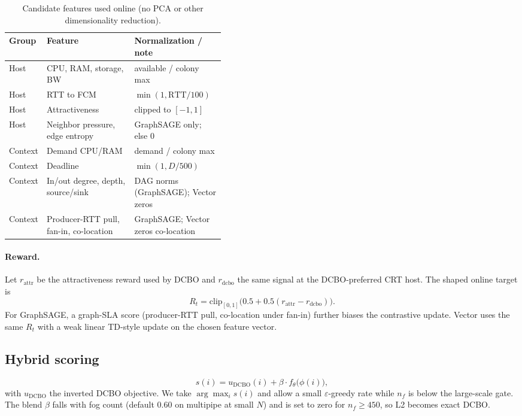 \documentclass[11pt,a4paper]{article}
\begin{document}
\begin{table}[htbp]
\centering
\caption{Candidate features used online (no PCA or other dimensionality reduction).}
\label{tab:features}
\small
\begin{tabular}{@{}llp{0.42\linewidth}@{}}
\toprule
Group & Feature & Normalization / note \\
\midrule
Host & CPU, RAM, storage, BW & available / colony max \\
Host & RTT to FCM & $\min(1,\mathrm{RTT}/100)$ \\
Host & Attractiveness & clipped to $[-1,1]$ \\
Host & Neighbor pressure, edge entropy & GraphSAGE only; else $0$ \\
Context & Demand CPU/RAM & demand / colony max \\
Context & Deadline & $\min(1,D/500)$ \\
Context & In/out degree, depth, source/sink & DAG norms (GraphSAGE); Vector zeros \\
Context & Producer-RTT pull, fan-in, co-location & GraphSAGE; Vector zeros co-location \\
\bottomrule
\end{tabular}
\end{table}

\paragraph{Reward.}
Let $r_{\mathrm{attr}}$ be the attractiveness reward used by DCBO and
$r_{\mathrm{dcbo}}$ the same signal at the DCBO-preferred CRT host. The shaped
online target is
\begin{equation}
R_t=\mathrm{clip}_{[0,1]}\bigl(0.5+0.5(r_{\mathrm{attr}}-r_{\mathrm{dcbo}})\bigr).
\end{equation}
For GraphSAGE, a graph-SLA score (producer-RTT pull, co-location under fan-in) further
biases the contrastive update. Vector uses the same $R_t$ with a weak linear
TD-style update on the chosen feature vector.

\subsection{Hybrid scoring}
\begin{equation}
s(i)=u_{\mathrm{DCBO}}(i)+\beta\cdot f_\theta\bigl(\phi(i)\bigr),
\label{eq:hybrid}
\end{equation}
with $u_{\mathrm{DCBO}}$ the inverted DCBO objective. We take $\arg\max_i s(i)$
and allow a small $\varepsilon$-greedy rate while $n_f$ is below the large-scale
gate. The blend $\beta$ falls with fog count (default $0.60$ on multipipe at
small $N$) and is set to zero for $n_f\ge 450$, so L2 becomes exact DCBO.
\end{document}
